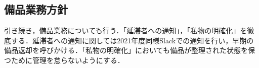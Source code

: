 \subsection*{備品業務方針}


引き続き，備品業務についても行う．「延滞者への通知」，「私物の明確化」を徹底する．延滞者への通知に関しては2021年度同様Slackでの通知を行い，早期の備品返却を呼びかける．「私物の明確化」においても備品が整理された状態を保つために管理を怠らないようにする．
